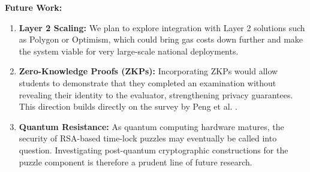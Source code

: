 \documentclass[final,5p,times]{elsarticle}
\begin{document}
\textbf{Future Work:}
\begin{enumerate}
    \item \textbf{Layer 2 Scaling:} We plan to explore integration with Layer 2 solutions such as Polygon or Optimism, which could bring gas costs down further and make the system viable for very large-scale national deployments.
    \item \textbf{Zero-Knowledge Proofs (ZKPs):} Incorporating ZKPs would allow students to demonstrate that they completed an examination without revealing their identity to the evaluator, strengthening privacy guarantees. This direction builds directly on the survey by Peng et al. \cite{zeroknowledgeproof}.
    \item \textbf{Quantum Resistance:} As quantum computing hardware matures, the security of RSA-based time-lock puzzles may eventually be called into question. Investigating post-quantum cryptographic constructions for the puzzle component is therefore a prudent line of future research.
\end{enumerate}



\end{document}
